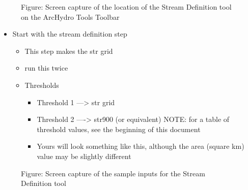 \documentclass[letterpaper,10pt,english]{sphinxmanual}
\begin{document}
\begin{figure}[htbp]
\centering
\capstart

\noindent{}
\caption{Figure: Screen capture of the location of the Stream Definition tool on the ArcHydro Tools Toolbar}\label{\detokenize{ex_2:id4}}\end{figure}
\begin{itemize}
\item {} 
Start with the stream definition step
\begin{itemize}
\item {} 
This step makes the str grid

\item {} 
run this twice

\item {} 
Thresholds
\begin{itemize}
\item {} 
Threshold 1  —\textgreater{} str grid

\item {} 
Threshold 2 —-\textgreater{} str900 (or equivalent) NOTE: for a table of threshold values, see the beginning of this document

\item {} 
Yours will look something like this, although the area (square km) value may be slightly different

\end{itemize}

\end{itemize}

\end{itemize}

\begin{figure}[htbp]
\centering
\capstart

\noindent{}
\caption{Figure: Screen capture of the sample inputs for the Stream Definition tool}\label{\detokenize{ex_2:id5}}\end{figure}
\end{document}
